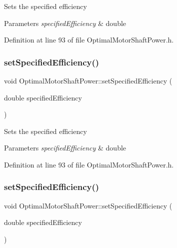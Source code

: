 Sets the specified efficiency 
\begin{DoxyParams}{Parameters}
{\em specified\+Efficiency} & double \\
\hline
\end{DoxyParams}


Definition at line 93 of file Optimal\+Motor\+Shaft\+Power.\+h.

\mbox{\label{class_optimal_motor_shaft_power_a92f7da022e380abbd8cfd308e8aa5e58}} 
\subsubsection{\texorpdfstring{set\+Specified\+Efficiency()}{setSpecifiedEfficiency()}\hspace{0.1cm}{\footnotesize\ttfamily [2/3]}}
{\footnotesize\ttfamily void Optimal\+Motor\+Shaft\+Power\+::set\+Specified\+Efficiency (\begin{DoxyParamCaption}\item[{double}]{specified\+Efficiency }\end{DoxyParamCaption})\hspace{0.3cm}{\ttfamily [inline]}}

Sets the specified efficiency 
\begin{DoxyParams}{Parameters}
{\em specified\+Efficiency} & double \\
\hline
\end{DoxyParams}


Definition at line 93 of file Optimal\+Motor\+Shaft\+Power.\+h.

\mbox{\label{class_optimal_motor_shaft_power_a92f7da022e380abbd8cfd308e8aa5e58}} 
\subsubsection{\texorpdfstring{set\+Specified\+Efficiency()}{setSpecifiedEfficiency()}\hspace{0.1cm}{\footnotesize\ttfamily [3/3]}}
{\footnotesize\ttfamily void Optimal\+Motor\+Shaft\+Power\+::set\+Specified\+Efficiency (\begin{DoxyParamCaption}\item[{double}]{specified\+Efficiency }\end{DoxyParamCaption})\hspace{0.3cm}{\ttfamily [inline]}}

